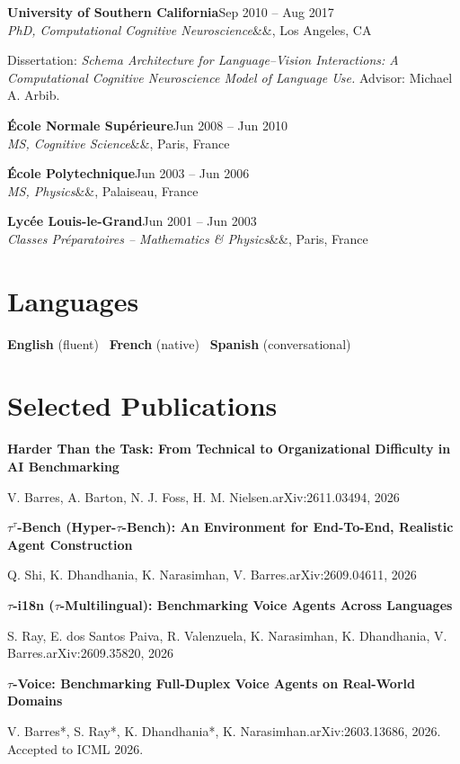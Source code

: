 \documentclass[10.5pt,a4paper]{article}
\newcommand{\edu}[5]{%
  \noindent
  \textbf{#1}\hfill\textcolor{muted}{#3}\\
  \textit{#4}\ifx&#5&\else, #5\fi\hfill\textcolor{muted}{#2}\par
  \vspace{2pt}
}
\newcommand{\paper}[3]{%
  \noindent
  \textbf{#1}\par
  \textcolor{muted}{\small #2.\hfill #3}\par
  \vspace{4pt}
}
\begin{document}
\edu{University of Southern California}{Los Angeles, CA}{Sep 2010 – Aug 2017}
  {PhD, Computational Cognitive Neuroscience}{}
Dissertation: \emph{Schema Architecture for Language–Vision Interactions: A Computational Cognitive Neuroscience Model of Language Use.} Advisor: Michael A. Arbib.
\vspace{4pt}

\edu{École Normale Supérieure}{Paris, France}{Jun 2008 – Jun 2010}
  {MS, Cognitive Science}{}
\vspace{2pt}

\edu{École Polytechnique}{Palaiseau, France}{Jun 2003 – Jun 2006}
  {MS, Physics}{}
\vspace{2pt}

\edu{Lycée Louis-le-Grand}{Paris, France}{Jun 2001 – Jun 2003}
  {Classes Préparatoires – Mathematics \& Physics}{}

\section*{Languages}

\textbf{English} (fluent) \textperiodcentered\ \textbf{French} (native) \textperiodcentered\ \textbf{Spanish} (conversational)

\section*{Selected Publications}

\paper{Harder Than the Task: From Technical to Organizational Difficulty in AI Benchmarking}
  {V. Barres, A. Barton, N. J. Foss, H. M. Nielsen}
  {arXiv:2611.03494, 2026}

\paper{$\tau^\tau$-Bench (Hyper-$\tau$-Bench): An Environment for End-To-End, Realistic Agent Construction}
  {Q. Shi, K. Dhandhania, K. Narasimhan, V. Barres}
  {arXiv:2609.04611, 2026}

\paper{$\tau$-i18n ($\tau$-Multilingual): Benchmarking Voice Agents Across Languages}
  {S. Ray, E. dos Santos Paiva, R. Valenzuela, K. Narasimhan, K. Dhandhania, V. Barres}
  {arXiv:2609.35820, 2026}

\paper{$\tau$-Voice: Benchmarking Full-Duplex Voice Agents on Real-World Domains}
  {V. Barres*, S. Ray*, K. Dhandhania*, K. Narasimhan}
  {arXiv:2603.13686, 2026. Accepted to ICML 2026.}
\end{document}
